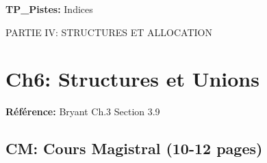 \documentclass[10pt,a4paper]{article}
\begin{document}
\textbf{TP\_Pistes:} Indices

\newpage

\begin{partbox}
PARTIE IV: STRUCTURES ET ALLOCATION
\end{partbox}

\section{Ch6: Structures et Unions}

\textbf{Référence:} Bryant Ch.3 Section 3.9

\subsection*{CM: Cours Magistral (10-12 pages)}
\end{document}
